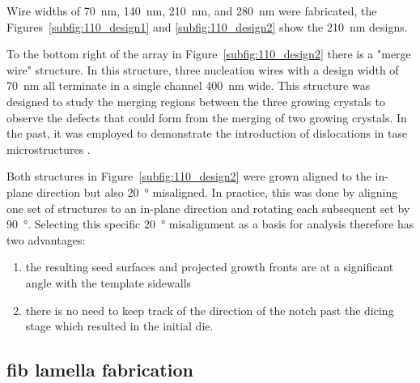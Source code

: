 Wire widths of \qty{70}{\nano\metre}, \qty{140}{\nano\metre}, \qty{210}{\nano\metre}, and \qty{280}{\nano\metre} were fabricated, the Figures~\ref{subfig:110_design1} and \ref{subfig:110_design2} show the \qty{210}{\nano\metre} designs.

To the bottom right of the array in Figure~\ref{subfig:110_design2} there is a "merge wire" structure. In this structure, three nucleation wires with a design width of \qty{70}{\nano\metre} all terminate in a single channel \qty{400}{\nano\metre} wide. This structure was designed to study the merging regions between the three growing crystals to observe the defects that could form from the merging of two growing crystals. In the past, it was employed to demonstrate the introduction of dislocations in \acs{tase} microstructures \cite{Mauthe2021}.

Both structures in Figure~\ref{subfig:110_design2} were grown aligned to the in-plane  direction but also \qty{20}{\degree} misaligned. In practice, this was done by aligning one set of structures to an in-plane  direction and rotating each subsequent set by \qty{90}{\degree}. Selecting this specific \qty{20}{\degree} misalignment as a basis for analysis therefore has two advantages:
\begin{enumerate}
    \item the resulting seed surfaces and projected growth fronts are at a significant angle with the template sidewalls
    \item there is no need to keep track of the direction of the notch past the dicing stage which resulted in the initial  die.
\end{enumerate}

\subsection{\texorpdfstring{\acs{fib} lamella fabrication}{FIB lamella fabrication}}

